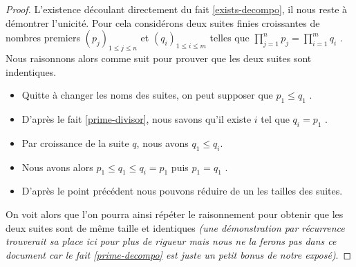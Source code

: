 \begin{proof}
	L'existence découlant directement du fait \ref{exists-decompo}, il nous reste à démontrer l'unicité.
	Pour cela considérons deux suites finies croissantes de nombres premiers
	$(p_j)_{1 \leq j \leq n}$
	et
	$(q_i)_{1 \leq i \leq m}$
	telles que $\displaystyle \prod_{j=1}^{n} p_j = \prod_{i=1}^{m} q_i$ .
	Nous raisonnons alors comme suit pour prouver que les deux suites sont indentiques.
	
	\begin{itemize}[label=\small\textbullet]
		\item Quitte à changer les noms des suites, on peut supposer que $p_1 \leq q_1$ .
		

		\item D'après le fait \ref{prime-divisor}, nous savons qu'il existe $i$ tel que $q_i = p_1$ .
	
		\item Par croissance de la suite $q$, nous avons $q_1 \leq q_i$.
		
		\item Nous avons alors $p_1 \leq q_1 \leq q_i = p_1$ puis $p_1 = q_1$ .
		
		\item D'après le point précédent nous pouvons réduire de un les tailles des suites.
	\end{itemize}
	
	On voit alors que l'on pourra ainsi répéter le raisonnement pour obtenir que les deux suites sont de même taille et identiques \emph{(une démonstration par récurrence trouverait sa place ici pour plus de rigueur mais nous ne la ferons pas dans ce document car le fait \ref{prime-decompo} est juste un petit bonus de notre exposé)}.
\end{proof}
